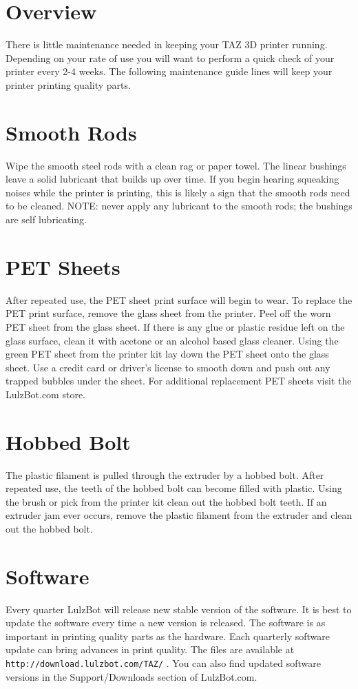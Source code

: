 \section{Overview}
There is little maintenance needed in keeping your TAZ 3D printer running. Depending on your rate of use you will want to perform a quick check of your printer every 2-4 weeks. The following maintenance guide lines will keep your printer printing quality parts.

\section{Smooth Rods}
Wipe the smooth steel rods with a clean rag or paper towel. The linear bushings leave a solid lubricant that builds up over time. If you begin hearing squeaking noises while the printer is printing, this is likely a sign that the smooth rods need to be cleaned. NOTE: never apply any lubricant to the smooth rods; the bushings are self lubricating.

\section{PET Sheets}
After repeated use, the PET sheet print surface will begin to wear. To replace the PET print surface, remove the glass sheet from the printer. Peel off the worn PET sheet from the glass sheet. If there is any glue or plastic residue left on the glass surface, clean it with acetone or an alcohol based glass cleaner. Using the green PET sheet from the printer kit lay down the PET sheet onto the glass sheet. Use a credit card or driver's license to smooth down and push out any trapped bubbles under the sheet. For additional replacement PET sheets visit the LulzBot.com store.

\section{Hobbed Bolt}
The plastic filament is pulled through the extruder by a hobbed bolt. After repeated use, the teeth of the hobbed bolt can become filled with plastic. Using the brush or pick from the printer kit clean out the hobbed bolt teeth. If an extruder jam ever occurs, remove the plastic filament from the extruder and clean out the hobbed bolt.

\section{Software}
Every quarter LulzBot will release new stable version of the software. It is best to update the software every time a new version is released. The software is as important in printing quality parts as the hardware. Each quarterly software update can bring advances in print quality. The files are available at \texttt{http://download.lulzbot.com/TAZ/} . You can also find updated software versions in the Support/Downloads section of LulzBot.com.

